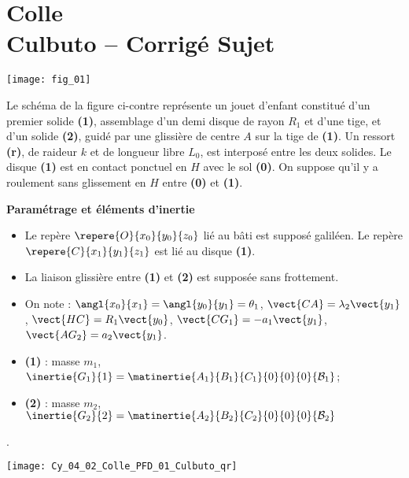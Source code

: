 \chapter*{Colle  \\ 
Culbuto -- \ifprof Corrigé \else Sujet \fi}

\iflivret {} \else
\ifprof  {} \else \fi
\fi

\setcounter{question}{0}



\begin{marginfigure}
\texttt{[image: fig\_01]}
\end{marginfigure}
Le schéma de la figure ci-contre représente un jouet d’enfant constitué d’un premier solide \textbf{(1)}, assemblage d’un demi disque de rayon $R_1$ et d’une tige, et d’un solide \textbf{(2)}, guidé par une glissière de centre $A$ sur la tige de \textbf{(1)}.
Un ressort \textbf{(r)}, de raideur $k$ et de longueur libre $L_0$, est interposé entre les deux solides.
Le disque \textbf{(1)} est en contact ponctuel en $H$ avec le sol \textbf{(0)}. On suppose qu’il y a roulement sans glissement en $H$ entre \textbf{(0)} et \textbf{(1)}.

\textbf{Paramétrage et éléments d'inertie}
\begin{itemize}
\item Le repère $\repere{O}{x_0}{y_0}{z_0}$ lié au bâti est supposé galiléen. Le repère $\repere{C}{x_1}{y_1}{z_1}$ est lié au disque \textbf{(1)}.
\item La liaison glissière entre \textbf{(1)} et \textbf{(2)} est supposée sans frottement.
\item On note : $\angl{x_0}{x_1}=\angl{y_0}{y_1}=\theta_1$, 
$\vect{CA}=\lambda_2\vect{y_1}$, 
$\vect{HC}=R_1\vect{y_0}$,  
$\vect{CG_1}=-a_1\vect{y_1}$,
$\vect{AG_2}=a_2\vect{y_1}$.
\item \textbf{(1)} : masse $m_1$, $\inertie{G_1}{1}=\matinertie{A_1}{B_1}{C_1}{0}{0}{0}{\mathcal{B}_1}$;
\item \textbf{(2)} : masse $m_2$, $\inertie{G_2}{2}=\matinertie{A_2}{B_2}{C_2}{0}{0}{0}{\mathcal{B}_2}$
\end{itemize}.

\ifprof
\else
\begin{marginfigure}
\centering
\texttt{[image: Cy\_04\_02\_Colle\_PFD\_01\_Culbuto\_qr]}
\end{marginfigure}
\fi






